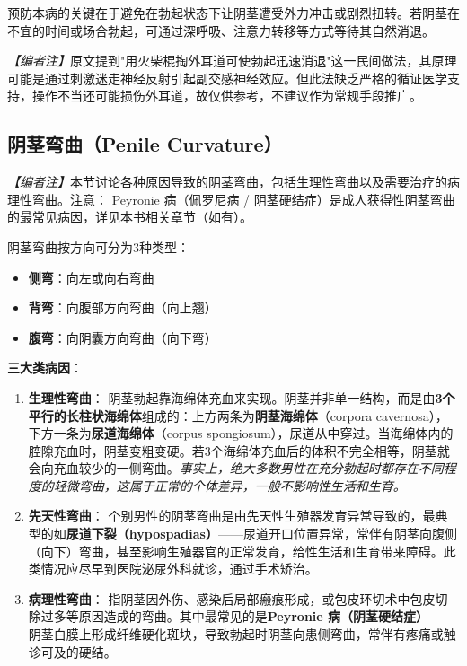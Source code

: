 \begin{tcolorbox}[colback=pink!5!white,colframe=red!50!black,title=贴心小叮咛]
预防本病的关键在于避免在勃起状态下让阴茎遭受外力冲击或剧烈扭转。若阴茎在不宜的时间或场合勃起，可通过深呼吸、注意力转移等方式等待其自然消退。

\noindent\textit{【编者注】}原文提到"用火柴棍掏外耳道可使勃起迅速消退"这一民间做法，其原理可能是通过刺激迷走神经反射引起副交感神经效应。但此法缺乏严格的循证医学支持，操作不当还可能损伤外耳道，故仅供参考，不建议作为常规手段推广。
\end{tcolorbox}

\subsection{阴茎弯曲（Penile Curvature）}
\label{subsec:penile_curvature}

\noindent\textit{【编者注】}本节讨论各种原因导致的阴茎弯曲，包括生理性弯曲以及需要治疗的病理性弯曲。注意： Peyronie 病（佩罗尼病 / 阴茎硬结症）是成人获得性阴茎弯曲的最常见病因，详见本书相关章节（如有）。

\vspace{0.5em}
阴茎弯曲按方向可分为3种类型：
\begin{itemize}
	\item \textbf{侧弯}：向左或向右弯曲
	\item \textbf{背弯}：向腹部方向弯曲（向上翘）
	\item \textbf{腹弯}：向阴囊方向弯曲（向下弯）
\end{itemize}

\vspace{0.5em}
\noindent\textbf{三大类病因}：

\begin{enumerate}
	\item \textbf{生理性弯曲}：
	阴茎勃起靠海绵体充血来实现。阴茎并非单一结构，而是由\textbf{3个平行的长柱状海绵体}组成的：上方两条为\textbf{阴茎海绵体}（corpora cavernosa），下方一条为\textbf{尿道海绵体}（corpus spongiosum），尿道从中穿过。当海绵体内的腔隙充血时，阴茎变粗变硬。若3个海绵体充血后的体积不完全相等，阴茎就会向充血较少的一侧弯曲。\textit{事实上，绝大多数男性在充分勃起时都存在不同程度的轻微弯曲，这属于正常的个体差异，一般不影响性生活和生育。}

	\item \textbf{先天性弯曲}：
	个别男性的阴茎弯曲是由先天性生殖器发育异常导致的，最典型的如\textbf{尿道下裂（hypospadias）}——尿道开口位置异常，常伴有阴茎向腹侧（向下）弯曲，甚至影响生殖器官的正常发育，给性生活和生育带来障碍。此类情况应尽早到医院泌尿外科就诊，通过手术矫治。

	\item \textbf{病理性弯曲}：
	指阴茎因外伤、感染后局部瘢痕形成，或包皮环切术中包皮切除过多等原因造成的弯曲。其中最常见的是\textbf{Peyronie 病（阴茎硬结症）}——阴茎白膜上形成纤维硬化斑块，导致勃起时阴茎向患侧弯曲，常伴有疼痛或触诊可及的硬结。
\end{enumerate}

